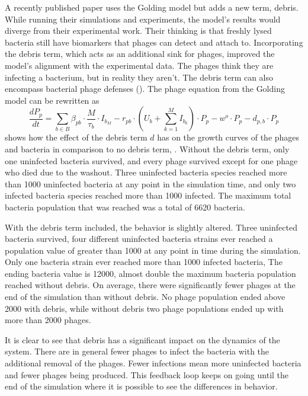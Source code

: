 A recently published paper \citet{deyEmergentHigherorderInteractions2025} uses the Golding model but adds a new term, debris. While running their simulations and experiments, the model's results would diverge from their experimental work. 
Their thinking is that freshly lysed bacteria still have biomarkers that phages can detect and attach to. 
Incorporating the debris term, which acts as an additional sink for phages, improved the model's alignment with the experimental data.
The phages think they are infecting a bacterium, but in reality they aren't. 
The debris term can also encompass bacterial phage defenses (). 
The phage equation from the Golding model can be rewritten as 
\[
    \frac{dP_p}{dt} = \sum_{b\in B}\beta_{p b}\cdot\frac{M}{\tau_b} \cdot I_{b_M} - r_{p b}\cdot(U_b + \sum_{k=1}^{M} I_{b_k})\cdot P_p - w^o \cdot P_p - d_{p, b} \cdot P_p
\]
 shows how the effect of the debris term $d$ has on the growth curves of the phages and bacteria in comparison to no debris term, . 
Without the debris term, only one uninfected bacteria survived, and every phage survived except for one phage who died due to the washout. 
Three uninfected bacteria species reached more than 1000 uninfected bacteria at any point in the simulation time, and only two infected bacteria species reached more than 1000 infected. 
The maximum total bacteria population that was reached was a total of 6620 bacteria. 

With the debris term included, the behavior is slightly altered. 
Three uninfected bacteria survived, four different uninfected bacteria strains ever reached a population value of greater than 1000 at any point in time during the simulation. 
Only one bacteria strain ever reached more than 1000 infected bacteria, 
The ending bacteria value is 12000, almost double the maximum bacteria population reached without debris. 
On average, there were significantly fewer phages at the end of the simulation than without debris. 
No phage population ended above 2000 with debris, while without debris two phage populations ended up with more than 2000 phages. 

It is clear to see that debris has a significant impact on the dynamics of the system. 
There are in general fewer phages to infect the bacteria with the additional removal of the phages. 
Fewer infections mean more uninfected bacteria and fewer phages being produced. 
This feedback loop keeps on going until the end of the simulation where it is possible to see the differences in behavior. 

